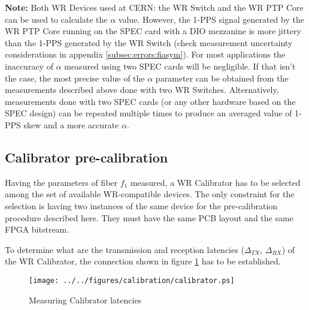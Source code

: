 {\bf Note:} Both WR Devices used at CERN: the WR Switch and the WR PTP Core can
be used to calculate the $\alpha$ value. However, the 1-PPS signal generated by
the WR PTP Core running on the SPEC card with a DIO mezzanine is more jittery
than the 1-PPS generated by the WR Switch (check measurement uncertainty
considerations in appendix \ref{subsec:errors:fiasym}). For most applications
the inaccuracy of $\alpha$ measured using two SPEC cards will be negligible. If
that isn't the case, the most precise value of the $\alpha$ parameter can be
obtained from the measurements described above done with two WR Switches.
Alternatively, measurements done with two SPEC cards (or any other hardware
based on the SPEC design) can be repeated multiple times to produce an averaged
value of 1-PPS skew and a more accurate $\alpha$.


\subsection{Calibrator pre-calibration}
\label{sec:procedure:calibrator}

Having the parameters of fiber $f_1$ measured, a WR Calibrator has to be
selected among the set of available WR-compatible devices. The only
constraint for the selection is having two instances of the same device
for the pre-calibration procedure described here. They must have the
same PCB layout and the same FPGA bitstream.

To determine what are the transmission and reception latencies ($\Delta_{TX}$,
$\Delta_{RX}$) of the WR Calibrator, the connection shown in figure
\ref{fig:calibrator} has to be established.

\begin{figure}[ht]
	\begin{center}
		\texttt{[image: ../../figures/calibration/calibrator.ps]}
		\caption{Measuring Calibrator latencies}
		\label{fig:calibrator}
	\end{center}
\end{figure}

